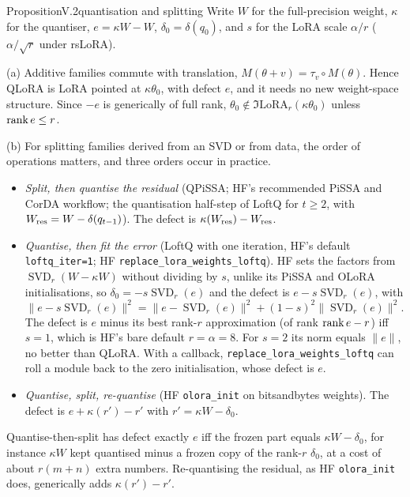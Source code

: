 \begin{restate}{Proposition}{V.2}{quantisation and splitting}
Write $W$ for the full-precision weight, $\kappa$ for the quantiser, $e=\kappa W-W$, $\delta_0=\delta(q_0)$, and $s$ for the
LoRA scale $\alpha/r$ ($\alpha/\sqrt r$ under rsLoRA).

(a) Additive families commute with translation, $M(\theta+v)=\tau_v\circ M(\theta)$. Hence QLoRA is LoRA pointed at
$\kappa\theta_0$, with defect $e$, and it needs no new weight-space structure. Since $-e$ is generically of full rank,
$\theta_0\notin\Im\mathrm{LoRA}_r(\kappa\theta_0)$ unless $\operatorname{rank} e\le r$.

(b) For splitting families derived from an SVD or from data, the order of operations matters, and three orders occur in
practice.
\begin{itemize}
  \item \emph{Split, then quantise the residual} (QPiSSA; HF's recommended PiSSA and CorDA workflow; the quantisation
  half-step of LoftQ for $t\ge2$, with $W_{\rm res}=W-\delta(q_{t-1})$). The defect is $\kappa(W_{\rm res})-W_{\rm res}$.
  \item \emph{Quantise, then fit the error} (LoftQ with one iteration, HF's default \texttt{loftq\_iter=1}; HF
  \texttt{replace\_\allowbreak lora\_\allowbreak weights\_\allowbreak loftq}). HF sets the factors from
  $\operatorname{SVD}_r(W-\kappa W)$ without dividing by $s$, unlike its PiSSA and OLoRA initialisations, so
  $\delta_0=-s\operatorname{SVD}_r(e)$ and the defect is $e-s\operatorname{SVD}_r(e)$, with
  \[\lVert e-s\operatorname{SVD}_r(e)\rVert^2=\lVert e-\operatorname{SVD}_r(e)\rVert^2+(1-s)^2\lVert\operatorname{SVD}_r(e)\rVert^2.\]
  The defect is $e$ minus its best rank-$r$ approximation (of rank $\operatorname{rank} e-r$) iff $s=1$, which is HF's bare default
  $r=\alpha=8$. For $s=2$ its norm equals $\lVert e\rVert$, no better than QLoRA. With a callback,
  \texttt{replace\_\allowbreak lora\_\allowbreak weights\_\allowbreak loftq} can roll a module back to the zero
  initialisation, whose defect is $e$.
  \item \emph{Quantise, split, re-quantise} (HF \texttt{olora\_init} on bitsandbytes weights). The defect is
  $e+\kappa(r')-r'$ with $r'=\kappa W-\delta_0$.
\end{itemize}
Quantise-then-split has defect exactly $e$ iff the frozen part equals $\kappa W-\delta_0$, for instance $\kappa W$ kept
quantised minus a frozen copy of the rank-$r$ $\delta_0$, at a cost of about $r(m+n)$ extra numbers. Re-quantising the
residual, as HF \texttt{olora\_init} does, generically adds $\kappa(r')-r'$.


\end{restate}

